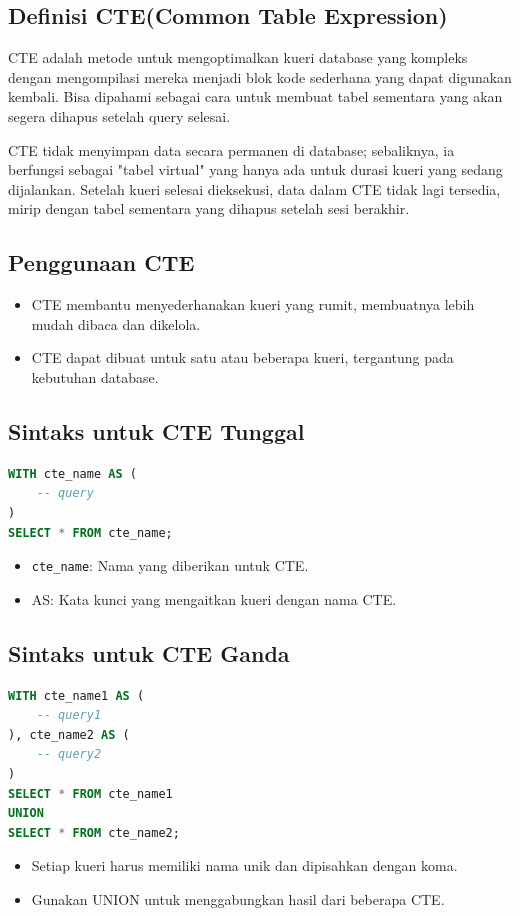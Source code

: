 \documentclass{article}
\begin{document}
\subsection{Definisi CTE(Common Table Expression)}
CTE adalah metode untuk mengoptimalkan kueri database yang kompleks dengan mengompilasi mereka menjadi blok kode sederhana yang dapat digunakan kembali. Bisa dipahami sebagai cara untuk membuat tabel sementara yang akan segera dihapus setelah query selesai.

CTE tidak menyimpan data secara permanen di database; sebaliknya, ia berfungsi sebagai "tabel virtual" yang hanya ada untuk durasi kueri yang sedang dijalankan. Setelah kueri selesai dieksekusi, data dalam CTE tidak lagi tersedia, mirip dengan tabel sementara yang dihapus setelah sesi berakhir.

\subsection{Penggunaan CTE}
\begin{itemize}
    \item CTE membantu menyederhanakan kueri yang rumit, membuatnya lebih mudah dibaca dan dikelola.
    \item CTE dapat dibuat untuk satu atau beberapa kueri, tergantung pada kebutuhan database.
\end{itemize}

\subsection{Sintaks untuk CTE Tunggal}
\begin{lstlisting}[language=SQL, caption={}, captionpos=b]
WITH cte_name AS (
    -- query
)
SELECT * FROM cte_name;
\end{lstlisting}
\begin{itemize}
    \item \verb|cte_name|: Nama yang diberikan untuk CTE.
    \item AS: Kata kunci yang mengaitkan kueri dengan nama CTE.
\end{itemize}

\subsection{Sintaks untuk CTE Ganda}
\begin{lstlisting}[language=SQL, caption={}, captionpos=b]
WITH cte_name1 AS (
    -- query1
), cte_name2 AS (
    -- query2
)
SELECT * FROM cte_name1
UNION
SELECT * FROM cte_name2;
\end{lstlisting}
\begin{itemize}
    \item Setiap kueri harus memiliki nama unik dan dipisahkan dengan koma.
    \item Gunakan UNION untuk menggabungkan hasil dari beberapa CTE.
\end{itemize}
\end{document}
